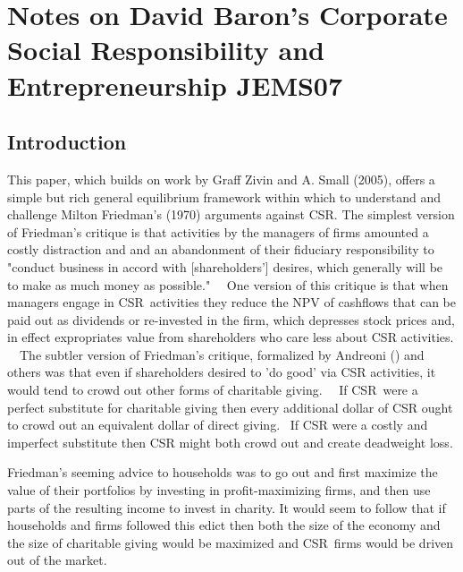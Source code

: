 \documentclass{article}
\begin{document}
\section{Notes on David Baron's Corporate Social Responsibility and
Entrepreneurship JEMS07}

\subsection{Introduction}

This paper, which builds on work by Graff Zivin and A. Small (2005), offers
a simple but rich general equilibrium framework within which to understand
and challenge Milton Friedman's (1970) arguments against CSR. The simplest
version of Friedman's critique is that activities by the managers of firms
amounted a costly distraction and and an  abandonment of their fiduciary
responsibility to "conduct business in accord with [shareholders'] desires,
which generally will be to make as much money as possible." \ \ One version
of this critique is that when managers engage in CSR\ activities they reduce
the NPV of cashflows that can be paid out as dividends or re-invested in the
firm, which depresses stock prices and, in effect expropriates value from
shareholders who care less about CSR activities. \ \ The subtler version of
Friedman's critique, formalized by Andreoni () and others was that even if
shareholders desired to 'do good' via CSR activities, it would tend to crowd
out other forms of charitable giving. \ \ If CSR\ were a perfect substitute
for charitable giving then every additional dollar of CSR ought to crowd out
an equivalent dollar of direct giving. \ If CSR were a costly and imperfect
substitute then CSR might both crowd out and create deadweight loss.

Friedman's seeming advice to households was to go out and first maximize the
value of their portfolios by investing in profit-maximizing firms, and then
use parts of the resulting income to invest in charity. It would seem to
follow that if households and firms followed this edict then both the size
of the economy and the size of charitable giving would be maximized and CSR\
firms would be driven out of the market.
\end{document}
